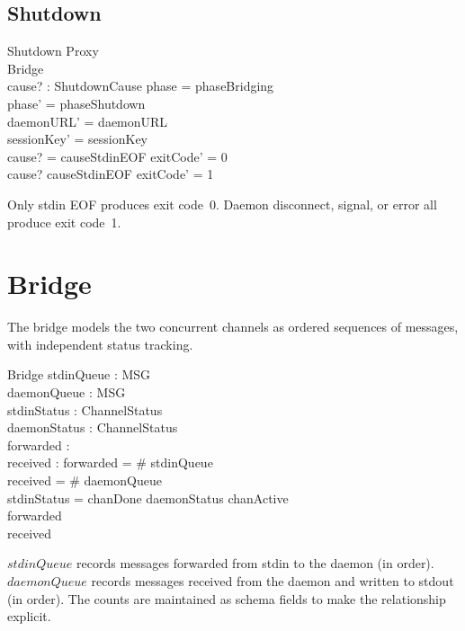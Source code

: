 \documentclass[a4paper,10pt,fleqn]{article}
\begin{document}
\subsection{Shutdown}

\begin{schema}{Shutdown}
  \Delta Proxy \\
  \Xi Bridge \\
  cause? : ShutdownCause
  \where
  phase = phaseBridging \\
  phase' = phaseShutdown \\
  daemonURL' = daemonURL \\
  sessionKey' = sessionKey \\
  cause? = causeStdinEOF \implies exitCode' = 0 \\
  cause? \neq causeStdinEOF \implies exitCode' = 1
\end{schema}

Only stdin EOF produces exit code~0.  Daemon disconnect, signal, or
error all produce exit code~1.

\section{Bridge}

The bridge models the two concurrent channels as ordered sequences of
messages, with independent status tracking.

\begin{schema}{Bridge}
  stdinQueue : \seq MSG \\
  daemonQueue : \seq MSG \\
  stdinStatus : ChannelStatus \\
  daemonStatus : ChannelStatus \\
  forwarded : \nat \\
  received : \nat
  \where
  forwarded = \# stdinQueue \\
  received = \# daemonQueue \\
  stdinStatus = chanDone \implies daemonStatus \neq chanActive \\
  forwarded  \\
  received 
\end{schema}

$stdinQueue$ records messages forwarded from stdin to the daemon (in
order). $daemonQueue$ records messages received from the daemon and
written to stdout (in order).  The counts are maintained as schema
fields to make the relationship explicit.
\end{document}

